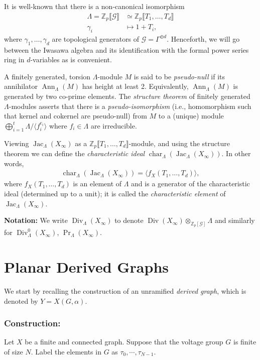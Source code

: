 \documentclass{amsart}
\numberwithin{equation}{section}
\theoremstyle{remark}
\newcommand{\Div}{\operatorname{Div}}
\newcommand{\Jac}{\operatorname{Jac}}
\newcommand{\Char}{\operatorname{char}}
\newcommand{\Z}{\mathbb{Z}}
\newcommand{\cG}{\mathcal{G}}
\theoremstyle{plain} %
\begin{document}
It is well-known \cite{Gre73} that there is a non-canonical isomorphism 
\begin{align*}
{\Lambda = }\Z_p\llbracket \cG \rrbracket &\simeq \Z_p \llbracket T_1,\dots, T_d \rrbracket\\
\gamma_i & \mapsto 1+T_i,
\end{align*}
where $\gamma_1,\dots ,\gamma_d$ are topological generators of $\mathcal{G} = {\Gamma^{\oplus d}}$.
{Henceforth, we will go between the Iwasawa algebra and its identification with the formal power series ring in $d$-variables as is convenient.}

{A finitely generated, torsion $\Lambda$-module $M$ is said to be \emph{pseudo-null} if its annihilator $\operatorname{Ann}_{\Lambda}(M)$ has height at least 2. Equivalently, $\operatorname{Ann}_{\Lambda}(M)$ is generated by two co-prime elements.
The \emph{structure theorem} of finitely generated $\Lambda$-modules asserts that there is a \emph{pseudo-isomorphism} (i.e., homomorphism such that kernel and cokernel are pseudo-null) from $M$ to a (unique) module $\bigoplus_{i=1}^t \Lambda/\langle f_i^{e_i}\rangle$ where $f_i\in \Lambda$ are irreducible.}


Viewing $\Jac_{\Lambda}(X_\infty)$ as a $\Z_p\llbracket T_1,\dots, T_d \rrbracket$-module, and using the structure theorem we can define the \textit{characteristic ideal} ${\Char}_{\Lambda}(\Jac_{\Lambda}(X_\infty))$.
In other words,
\begin{align}\label{pseudooo}
{\Char}_{\Lambda}(\Jac_{\Lambda}(X_\infty)) = \langle f_{X}(T_1, \ldots, T_d) \rangle,
\end{align}
where $f_X(T_1, \ldots, T_d)$ is an element of $\Lambda$ and is a generator of the characteristic ideal {(determined up to a unit)}; it is called the \emph{characteristic element} of $\Jac_{\Lambda}(X_\infty)$.

\textbf{Notation:}
We write $\Div_{\Lambda}(X_\infty)$ to denote $\Div(X_\infty) \otimes_{{\Z_p[\mathcal{G}]}} {\Lambda}$ 
and similarly for $\Div^0_{\Lambda}(X_\infty)$, $\Pr_{\Lambda}(X_\infty)$.


\section{Planar Derived Graphs}
\label{sec: planar derived graphs}

We start by recalling the construction of an unramified \emph{derived graph}, which is denoted by $Y=X(G,\alpha)$.

\subsubsection*{Construction:}
Let $X$ be a finite and connected graph.
Suppose that the voltage group $G$ is finite of size $N$.
Label the elements in $G$ as $\tau_0, \cdots, \tau_{N-1}$.
\end{document}

